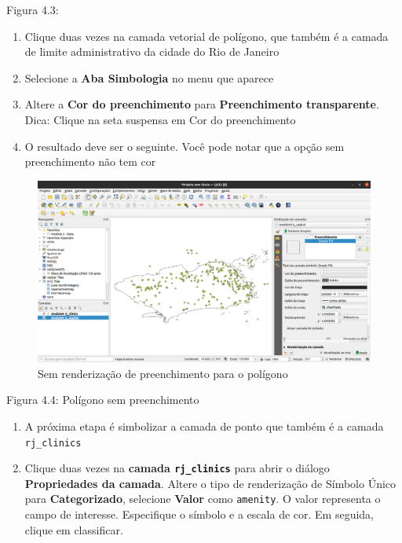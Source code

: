 \documentclass[
  portuguese,
]{krantz}
\providecommand{\tightlist}{%
  \setlength{\itemsep}{0pt}\setlength{\parskip}{0pt}}
\begin{document}
Figura 4.3:

\begin{enumerate}
\def\labelenumi{\arabic{enumi}.}
\setcounter{enumi}{3}
\tightlist
\item
  Clique duas vezes na camada vetorial de polígono, que também é a camada de limite administrativo da cidade do Rio de Janeiro
\item
  Selecione a \textbf{Aba Simbologia} no menu que aparece
\item
  Altere a \textbf{Cor do preenchimento} para \textbf{Preenchimento transparente}. Dica: Clique na seta suspensa em Cor do preenchimento
\item
  O resultado deve ser o seguinte. Você pode notar que a opção sem preenchimento não tem cor
\end{enumerate}

\begin{figure}
\centering
\includegraphics{media/modulo4/no-fill-render.png}
\caption{Sem renderização de preenchimento para o polígono}
\end{figure}

Figura 4.4: Polígono sem preenchimento

\begin{enumerate}
\def\labelenumi{\arabic{enumi}.}
\setcounter{enumi}{7}
\tightlist
\item
  A próxima etapa é simbolizar a camada de ponto que também é a camada \texttt{rj\_clinics}
\item
  Clique duas vezes na \textbf{camada \texttt{rj\_clinics}} para abrir o diálogo \textbf{Propriedades da camada}. Altere o tipo de renderização de Símbolo Único para \textbf{Categorizado}, selecione \textbf{Valor} como \texttt{amenity}. O valor representa o campo de interesse. Especifique o símbolo e a escala de cor. Em seguida, clique em classificar.
\end{enumerate}
\end{document}
